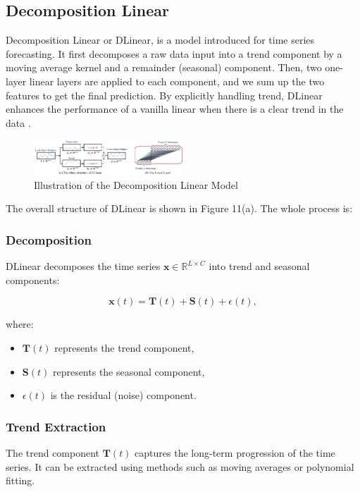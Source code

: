\documentclass{ieeeojies}
\begin{document}
\subsection{Decomposition Linear}
Decomposition Linear or DLinear, is a model introduced for time series forecasting.  It first decomposes a raw data input into a trend component by a moving average kernel and a remainder (seasonal) component. Then, two
one-layer linear layers are applied to each component,
and we sum up the two features to get the final prediction. By explicitly handling trend, DLinear enhances
the performance of a vanilla linear when there is a clear
trend in the data \cite{b15}.

\begin{figure} [H]
    \centering
    \includegraphics[width=0.5\textwidth]{bibliography/Figure/Illu_DLinear.png}
    \caption{Illustration of the Decomposition Linear Model}
    \label{fig:DLinear Illustration}
\end{figure}

The overall structure of DLinear is shown in Figure 11(a). The whole process is:

\subsubsection{Decomposition}
DLinear decomposes the time series $\mathbf{x} \in \mathbb{R}^{L \times C}$ into trend and seasonal components:

\begin{equation}
    \mathbf{x}(t) = \mathbf{T}(t) + \mathbf{S}(t) + \epsilon(t),
\end{equation}

where:
\begin{itemize}
    \item $\mathbf{T}(t)$ represents the trend component,
    \item $\mathbf{S}(t)$ represents the seasonal component,
    \item $\epsilon(t)$ is the residual (noise) component.
\end{itemize}

\subsubsection{Trend Extraction}
The trend component $\mathbf{T}(t)$ captures the long-term progression of the time series. It can be extracted using methods such as moving averages or polynomial fitting.
\end{document}
